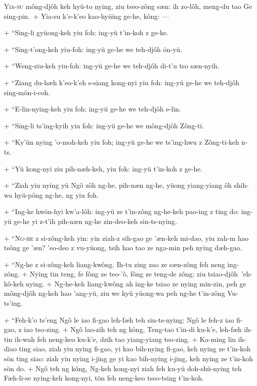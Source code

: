 \header
\lettrine{Y}{ia-su} mông-djôh keh hyü-to nying, ziu tseo-zông sæn: ih zo-lôh, meng-du tao Ge sing-pin.\
+	Yia-su k'e-k'eo kao-hyüing ge-he, kông: ---
\par
+	``Sing-li gyüong-keh yiu foh: ing-yü t'in-koh z ge-ke.
\par
+	``Sing-t'ong-keh yiu-foh: ing-yü ge-he we teh-djôh ön-yü.
\par
+	``Weng-ziu-keh yiu-foh: ing-yü ge-he we teh-djôh di-t'u tso sæn-nyih.
\par
+	``Ziang du-hæh k'eo-k'eh s-siang kong-nyi yiu foh: ing-yü ge-he we teh-djôh sing-mön-i-coh.
\par
+	``E-lin-nying-keh yiu foh: ing-yü ge-he we teh-djôh e-lin.
\par
+	``Sing-li ts'ing-kyih yiu foh: ing-yü ge-he we mông-djôh Zông-ti.
\par
+	``Ky'ün nying 'o-moh-keh yiu foh; ing-yü ge-he we ts'ing-hwu z Zông-ti-keh n-ts.
\par
+	``Yü kong-nyi ziu pih-næh-keh, yiu foh: ing-yü t'in-koh z ge-he.
\par
+	``Ziah yiu nying yü Ngô zôh ng-he, pih-næn ng-he, yüong yiang-yiang ôh shih-wa hyü-pông ng-he, ng yiu foh.
\par
+	``Ing-ke hwön-hyi kw'a-lôh: ing-yü ze t'in-zông ng-he-keh pao-ing z ting do: ing-yü ge-he yi z-t'ih pih-næn ng-he zin-deo-keh sin-ts-nying.
\par
+	``\textsc{Ng-he} z si-zông-keh yin: yin ziah-z sih-gao ge 'æn-keh mi-dao, yiu zah-m hao tsông ge 'æn? 'eo-deo z vu-yüong, tsih hao tao ze nga-min peh nying dæh-gao.
\par
+	``Ng-he z si-zông-keh liang-kwông. Ih-tu zing zao ze sæn-zông feh neng ing-zông.
+	Nying tin teng, fe fông ze teo-'ô, fông ze teng-de zông; ziu tsiao-djôh\ 'eh-kô-keh nying.
+	Ng-he-keh liang-kwông ah ing-ke tsiao ze nying min-zin, peh ge mông-djôh ng-keh hao 'ang-yü, ziu we kyü yüong-wa peh ng-he t'in-zông Vu-ts'ing.
\par
+	``Feh-k'o ts'eng Ngô le iao fi-gao leh-fæh teh sin-ts-nying: Ngô le feh-z iao fi-gao, z iao tso-zing.
+	Ngô lao-zih teh ng kông, Teng-tao t'in-di ku-k'e, leh-fæh ih-tin ih-wah feh neng-keo ku-k'e, dzih tao yiang-yiang tso-zing.
+	Ka-ming lin ih-diao ting siao, ziah yiu nying fi-gao, yi kao bih-nying fi-gao, keh nying ze t'in-koh sön ting siao: ziah yiu nying i-jing ge yi kao bih-nying i-jing, keh nying ze t'in-koh sön do.
+	Ngô teh ng kông, Ng-keh kong-nyi ziah feh ku-yü doh-shü-nying teh Fæh-li-se nying-keh kong-nyi, tön feh neng-keo tseo-tsing t'in-koh.
